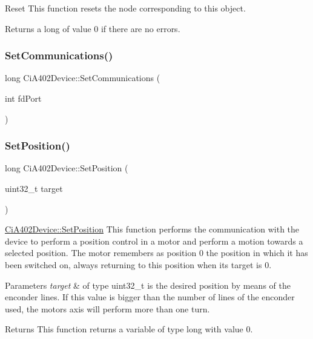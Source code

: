 Reset This function resets the node corresponding to this object. 

\begin{DoxyReturn}{Returns}
a long of value 0 if there are no errors. 
\end{DoxyReturn}
\mbox{\label{classCiA402Device_abf511a7d44b62ac93ae18fe21f8d51c9}} 
\subsubsection{\texorpdfstring{Set\+Communications()}{SetCommunications()}}
{\footnotesize\ttfamily long Ci\+A402\+Device\+::\+Set\+Communications (\begin{DoxyParamCaption}\item[{int}]{fd\+Port }\end{DoxyParamCaption})}

\mbox{\label{classCiA402Device_acb2d6cc96a8a613f9c2791e87344ba0d}} 
\subsubsection{\texorpdfstring{Set\+Position()}{SetPosition()}}
{\footnotesize\ttfamily long Ci\+A402\+Device\+::\+Set\+Position (\begin{DoxyParamCaption}\item[{uint32\+\_\+t}]{target }\end{DoxyParamCaption})}



\hyperlink{classCiA402Device_acb2d6cc96a8a613f9c2791e87344ba0d}{Ci\+A402\+Device\+::\+Set\+Position} This function performs the communication with the device to perform a position control in a motor and perform a motion towards a selected position. The motor remembers as position 0 the position in which it has been switched on, always returning to this position when its target is 0. 


\begin{DoxyParams}{Parameters}
{\em target} & of type uint32\+\_\+t is the desired position by means of the enconder lines. If this value is bigger than the number of lines of the enconder used, the motor\textquotesingle{}s axis will perform more than one turn. \\
\hline
\end{DoxyParams}
\begin{DoxyReturn}{Returns}
This function returns a variable of type long with value 0. 
\end{DoxyReturn}
\mbox{\label{classCiA402Device_a8c09be8df402061e170ca297a7ee6cfe}} 

